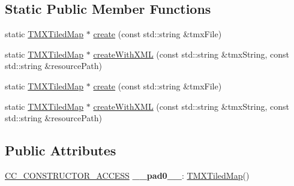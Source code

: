 \subsection*{Static Public Member Functions}
\begin{DoxyCompactItemize}
\item 
static \hyperlink{classTMXTiledMap}{T\+M\+X\+Tiled\+Map} $\ast$ \hyperlink{classTMXTiledMap_a64387b3c4d0369044917a4ef43f31aa0}{create} (const std\+::string \&tmx\+File)
\item 
static \hyperlink{classTMXTiledMap}{T\+M\+X\+Tiled\+Map} $\ast$ \hyperlink{classTMXTiledMap_af3a5adeaeec14ab3455494f0c230335b}{create\+With\+X\+ML} (const std\+::string \&tmx\+String, const std\+::string \&resource\+Path)
\item 
static \hyperlink{classTMXTiledMap}{T\+M\+X\+Tiled\+Map} $\ast$ \hyperlink{classTMXTiledMap_a8f0787367238690d49a54e5db1dd1294}{create} (const std\+::string \&tmx\+File)
\item 
static \hyperlink{classTMXTiledMap}{T\+M\+X\+Tiled\+Map} $\ast$ \hyperlink{classTMXTiledMap_acd5278187ebb5fcf1d1dbbd1fe42c3dd}{create\+With\+X\+ML} (const std\+::string \&tmx\+String, const std\+::string \&resource\+Path)
\end{DoxyCompactItemize}
\subsection*{Public Attributes}
\begin{DoxyCompactItemize}
\item 
\mbox{\label{classTMXTiledMap_a8e7b3acdacabf66c4510bc57fec2aad9}} 
\hyperlink{_2cocos2d_2cocos_2base_2ccConfig_8h_a25ef1314f97c35a2ed3d029b0ead6da0}{C\+C\+\_\+\+C\+O\+N\+S\+T\+R\+U\+C\+T\+O\+R\+\_\+\+A\+C\+C\+E\+SS} {\bfseries \+\_\+\+\_\+pad0\+\_\+\+\_\+}\+: \hyperlink{classTMXTiledMap}{T\+M\+X\+Tiled\+Map}()
\end{DoxyCompactItemize}
